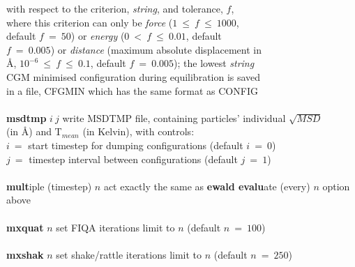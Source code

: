 \begin{tabbing}
\>                                              \> with respect to the criterion, {\em string}, and tolerance, $f$, \\
\>                                              \> where this criterion can only be {\em force} ($1~\le~f~\le~1000$, \\
\>                                              \> default $f~=~50$) or {\em energy} ($0~<~f~\le~0.01$, default \\
\>                                              \> $f~=~0.005$) or {\em distance} (maximum absolute displacement in \\
\>                                              \> \AA, $10^{-6}~\le~f~\le~0.1$, default $f~=~0.005$); the lowest {\em string} \\
\>                                              \> CGM minimised configuration during equilibration is saved \\
\>                                              \> in a file, CFGMIN which has the same format as CONFIG \\
\>                                              \> \\
\> {\bf msdtmp} $i~j$                           \> write MSDTMP file, containing particles' individual $\sqrt{MSD}$ \\
\>                                              \> (in \AA) and T$_{mean}$ (in Kelvin), with controls: \\
\>                                              \> $i~=$ start timestep for dumping configurations (default $i~=~0$) \\
\>                                              \> $j~=$ timestep interval between configurations (default $j~=~1$) \\
\>                                              \> \\
\> {\bf mult}iple (timestep) $n$                \> act exactly the same as {\bf ewald evalu}ate (every) $n$ option above \\
\>                                              \> \\
\> {\bf mxquat} $n$                             \> set FIQA iterations limit to $n$ (default $n~=~100$) \\
\>                                              \> \\
\> {\bf mxshak} $n$                             \> set shake/rattle iterations limit to $n$ (default $n~=~250$) \\
\>                                              \> \\

\end{tabbing}
